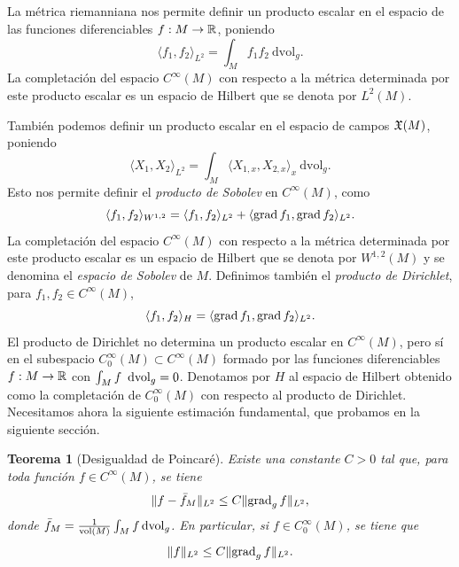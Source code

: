\documentclass[11pt,a4paper]{amsbook}
\newtheorem{thm}[subsection]{Teorema}
\theoremstyle{remark} \newtheorem{rmk}[subsection]{Observación}
\theoremstyle{definition} \newtheorem{defn}[subsection]{Definición}
\theoremstyle{definition} \newtheorem{ex}[subsection]{Ejemplo}
\theoremstyle{definition} \newtheorem{ej}[subsection]{Ejercicio}
\begin{document}
\subsection{} La métrica riemanniana nos permite definir un producto escalar en el espacio de las funciones diferenciables $f:M\rightarrow \mathbb R$, poniendo
\begin{equation*}
\langle f_1, f_2 \rangle_{L^2} = \int_M f_1f_2\ \mathrm{dvol}_g.
\end{equation*}
La completación del espacio $C^\infty(M)$ con respecto a la métrica determinada por este producto escalar es un espacio de Hilbert que se denota por $L^2(M)$.

También podemos definir un producto escalar en el espacio de campos $\mathfrak X(M)$, poniendo
\begin{equation*}
\langle X_1, X_2 \rangle_{L^2} = \int_M \langle X_{1,x}, X_{2,x} \rangle_x\ \mathrm{dvol}_g.
\end{equation*}
Esto nos permite definir el \emph{producto de Sobolev} en $C^\infty(M)$, como
\begin{equation*}
\langle f_1,f_2 \rangle_{W^{1,2}} = \langle f_1,f_2 \rangle_{L^2} + \langle \operatorname{grad} f_1, \operatorname{grad} f_2 \rangle_{L^2}.
\end{equation*}
La completación del espacio $C^\infty(M)$ con respecto a la métrica determinada por este producto escalar es un espacio de Hilbert que se denota por $W^{1,2}(M)$ y se denomina el \emph{espacio de Sobolev} de $M$.
Definimos también el \emph{producto de Dirichlet}, para $f_1,f_2 \in C^\infty(M)$,
\begin{equation*}
\langle f_1,f_2 \rangle_{H} = \langle \operatorname{grad} f_1, \operatorname{grad} f_2 \rangle_{L^2}.
\end{equation*}
El producto de Dirichlet no determina un producto escalar en $C^\infty(M)$, pero sí en el subespacio $C^\infty_0(M)\subset C^\infty(M)$ formado por las funciones diferenciables $f:M\rightarrow \mathbb R$ con $\int_M f\ \operatorname{dvol}_g = 0$. Denotamos por $H$ al espacio de Hilbert obtenido como la completación de $C^\infty_0(M)$ con respecto al producto de Dirichlet. Necesitamos ahora la siguiente estimación fundamental, que probamos en la siguiente sección.

\begin{thm}[Desigualdad de Poincaré] \label{thm:desigualdad_poincare}
  Existe una constante $C>0$ tal que, para toda función $f\in C^\infty(M)$, se tiene
  \begin{equation*}
\lVert f - \bar{f}_M \rVert_{L^2} \leq C \lVert \operatorname{grad}_g f \rVert_{L^2},
  \end{equation*}
  donde $\bar{f}_M= \tfrac{1}{\mathrm{vol}(M)} \int_M f \operatorname{dvol}_g$. En particular, si $f \in C^\infty_0(M)$, se tiene que
  \begin{equation*}
\lVert f \rVert_{L^2} \leq C \lVert \operatorname{grad}_g f \rVert_{L^2}.
  \end{equation*}
\end{thm}
\end{document}
